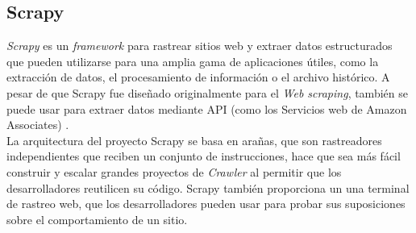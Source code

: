 
\subsection{Scrapy}
\textit{Scrapy} es un \textit{framework} para rastrear sitios web y extraer datos estructurados que pueden utilizarse para una amplia 
gama de aplicaciones útiles, como la extracción de datos, el procesamiento de información o el archivo histórico.
A pesar de que Scrapy fue diseñado originalmente para el \textit{Web scraping}, también se puede usar para extraer datos mediante 
API (como los Servicios web de Amazon Associates) \citep{CTScrapy}.\\

La arquitectura del proyecto Scrapy se basa en arañas, que son rastreadores independientes que reciben un conjunto de instrucciones,
hace que sea más fácil construir y escalar grandes proyectos de \textit{Crawler} al permitir que los desarrolladores reutilicen su 
código. Scrapy también proporciona un una terminal de rastreo web, que los desarrolladores pueden usar para probar sus suposiciones 
sobre el comportamiento de un sitio.

